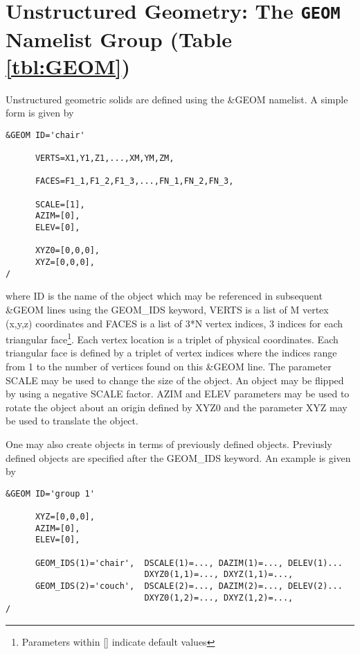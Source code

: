 \documentclass[12pt]{article}
\begin{document}
\vspace{1.0in}
\section{Unstructured Geometry: The \texorpdfstring{{\tt GEOM}}{GEOM} Namelist Group (Table \ref{tbl:GEOM})}
\label{info:GEOM}

Unstructured geometric solids are defined using the \&GEOM namelist.
A simple form is given by

\begin{verbatim}
&GEOM ID='chair'

      VERTS=X1,Y1,Z1,...,XM,YM,ZM,

      FACES=F1_1,F1_2,F1_3,...,FN_1,FN_2,FN_3,

      SCALE=[1],
      AZIM=[0],
      ELEV=[0],

      XYZ0=[0,0,0],
      XYZ=[0,0,0],
/
\end{verbatim}

\noindent where ID is the name of the object which may be referenced in subsequent \&GEOM lines using the GEOM\_IDS keyword, VERTS is a list of M vertex (x,y,z) coordinates and FACES is a list of 3*N vertex indices, 3 indices for each triangular face\footnote{Parameters within [] indicate default values}.  Each vertex location is a triplet of physical coordinates.  Each triangular face is defined by a triplet of vertex indices where the indices range from 1 to the number of vertices found on this \&GEOM line. The parameter SCALE may be used to change the size of the object. An object may be flipped by using a negative SCALE factor.  AZIM and ELEV parameters may be used to rotate the object about an origin defined by XYZ0 and the parameter XYZ may be used to translate the object.

One may also create objects in terms of previously defined objects.  Previusly defined objects are specified after the GEOM\_IDS keyword.  An example is given by

{%
\begin{verbatim}
&GEOM ID='group 1'

      XYZ=[0,0,0],
      AZIM=[0],
      ELEV=[0],

      GEOM_IDS(1)='chair',  DSCALE(1)=..., DAZIM(1)=..., DELEV(1)...
                            DXYZ0(1,1)=..., DXYZ(1,1)=...,
      GEOM_IDS(2)='couch',  DSCALE(2)=..., DAZIM(2)=..., DELEV(2)...
                            DXYZ0(1,2)=..., DXYZ(1,2)=...,
/
\end{verbatim}
}
\end{document}
